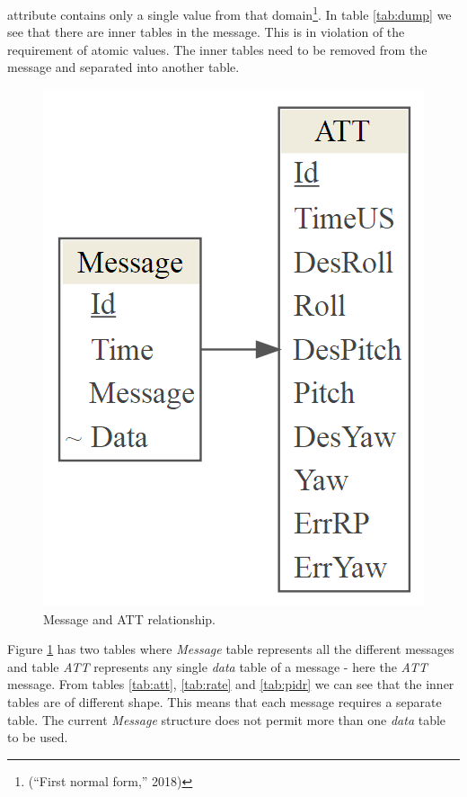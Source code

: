 \documentclass[12pt,oneside]{reedthesis}
\theoremstyle{definition}
\theoremstyle{definition}
\theoremstyle{definition}
\theoremstyle{remark}
\begin{document}
attribute contains only a single value from that domain\footnote{(``First
  normal form,'' 2018)}. In table \ref{tab:dump} we see that there are
inner tables in the message. This is in violation of the requirement of
atomic values. The inner tables need to be removed from the message and
separated into another table.
\begin{figure}
\centering
\includegraphics{./figure/1fn.PNG}
\caption{\label{fig:1fn}Message and ATT relationship.}
\end{figure}
Figure \ref{fig:1fn} has two tables where \emph{Message} table
represents all the different messages and table \emph{ATT} represents
any single \emph{data} table of a message - here the \emph{ATT} message.
From tables \ref{tab:att}, \ref{tab:rate} and \ref{tab:pidr} we can see
that the inner tables are of different shape. This means that each
message requires a separate table. The current \emph{Message} structure
does not permit more than one \emph{data} table to be used.
\end{document}
